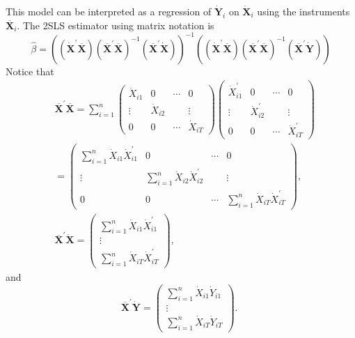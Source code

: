 \documentclass[10pt]{article}
\begin{document}
This model can be interpreted as a regression of $\dot{\boldsymbol{Y}}_{i}$ on $\dot{\boldsymbol{X}}_{i}$ using the instruments $\overline{\boldsymbol{X}}_{i}$. The 2SLS estimator using matrix notation is
$$
\widehat{\beta}=\left(\left(\dot{\boldsymbol{X}}^{\prime} \overline{\boldsymbol{X}}\right)\left(\overline{\boldsymbol{X}}^{\prime} \overline{\boldsymbol{X}}\right)^{-1}\left(\overline{\boldsymbol{X}}^{\prime} \dot{\boldsymbol{X}}\right)\right)^{-1}\left(\left(\dot{\boldsymbol{X}}^{\prime} \overline{\boldsymbol{X}}\right)\left(\overline{\boldsymbol{X}}^{\prime} \overline{\boldsymbol{X}}\right)^{-1}\left(\overline{\boldsymbol{X}}^{\prime} \dot{\boldsymbol{Y}}\right)\right)
$$
Notice that
$$
\begin{aligned}
& \overline{\boldsymbol{X}}^{\prime} \overline{\boldsymbol{X}}=\sum_{i=1}^{n}\left(\begin{array}{cccc}\dot{X}_{i 1} & 0 & \cdots & 0 \\\vdots & \dot{X}_{i 2} & & \vdots \\0 & 0 & \cdots & \dot{X}_{i T}\end{array}\right)\left(\begin{array}{cccc}\dot{X}_{i 1}^{\prime} & 0 & \cdots & 0 \\\vdots & \dot{X}_{i 2}^{\prime} & & \vdots \\0 & 0 & \cdots & \dot{X}_{i T}^{\prime}\end{array}\right) \\
& =\left(\begin{array}{cccc}\sum_{i=1}^{n} \dot{X}_{i 1} \dot{X}_{i 1}^{\prime} & 0 & \cdots & 0 \\\vdots & \sum_{i=1}^{n} \dot{X}_{i 2} \dot{X}_{i 2}^{\prime} & & \vdots \\0 & 0 & \cdots & \sum_{i=1}^{n} \dot{X}_{i T} \dot{X}_{i T}^{\prime}\end{array}\right) \text {, } \\
& \overline{\boldsymbol{X}}^{\prime} \dot{\boldsymbol{X}}=\left(\begin{array}{c}\sum_{i=1}^{n} \dot{X}_{i 1} \dot{X}_{i 1}^{\prime} \\\vdots \\\sum_{i=1}^{n} \dot{X}_{i T} \dot{X}_{i T}^{\prime}\end{array}\right) \text {, }
\end{aligned}
$$
and
$$
\overline{\boldsymbol{X}}^{\prime} \dot{\boldsymbol{Y}}=\left(\begin{array}{c}
\sum_{i=1}^{n} \dot{X}_{i 1} \dot{Y}_{i 1} \\
\vdots \\
\sum_{i=1}^{n} \dot{X}_{i T} \dot{Y}_{i T}
\end{array}\right) \text {. }
$$
\end{document}
